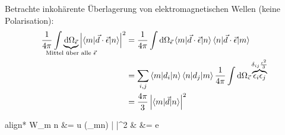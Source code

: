 	Betrachte inkohärente Überlagerung von elektromagnetischen Wellen (keine Polarisation):
		\begin{align*}
			\frac{1}{4 \pi} \int 
			\underbrace{\diff \Omega_{\vec{\epsilon}}}_{\mathclap{\text{Mittel über alle~} \vec{\epsilon}}} 
			\left|\braket{m | \vec{d} \cdot \vec{\epsilon} | n}\right|^2 
			&= \frac{1}{4 \pi} \int \diff \Omega_{\vec{\epsilon}} 
			\braket{m | \vec{d} \cdot \vec{\epsilon} | n} \braket{n | \vec{d} \cdot \vec{\epsilon} | m} \\
			&= \sum_{i,j} \braket{m | d_i | n} \braket{n | d_j | m} 
			\frac{1}{4 \pi} \int \diff \Omega_{\vec{\epsilon}} 
			\overbrace{\epsilon_i \epsilon_j}^{\mathclap{\delta_{ij}\frac{\epsilon^2}{3}}} \\
			&= \frac{4 \pi}{3} \left|\braket{m | \vec{d} | n}\right|^2
		\end{align*} 
		\begin{empheq}[box=\boxed]{align*}
			W_{m \leftarrow n} &= 
			 u (\omega_{mn}) 
			\left| \right|^2 
			&  &= e  
		\end{empheq}

